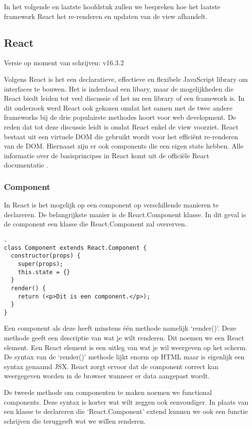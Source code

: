 In het volgende en laatste hoofdstuk zullen we bespreken hoe het laatste framework React het re-renderen en updaten van de view afhandelt.


\subsection{React}
\label{sec:JavaScript_Frameworks_React}
Versie op moment van schrijven: v16.3.2

Volgens React is het een declaratieve, effectieve en flexibele JavaScript library om interfaces te bouwen. Het is inderdaad een libary, maar de mogelijkheden die React biedt leiden tot veel discussie of het nu een library of een framework is. In dit onderzoek werd React ook gekozen omdat het samen met de twee andere frameworks bij de drie populairste methodes hoort voor web development. De reden dat tot deze discussie leidt is omdat React enkel de view voorziet. React bestaat uit een virtuele DOM die gebruikt wordt voor het efficiënt re-renderen van de DOM. Hiernaast zijn er ook components die een eigen state hebben.
Alle informatie over de basisprincipes in React komt uit de officiële React documentatie \autocite{_react_2018}.

\subsubsection{Component}
\label{sec:React_Component}
In React is het mogelijk op een component op verschillende manieren te declareren. De belangrijkste manier is de React.Component klasse. In dit geval is de component een klasse die React.Component zal overerven.

\begin{verbatim}.
class Component extends React.Component {
  constructor(props) {
    super(props);
    this.state = {}
  }  
  render() {
    return (<p>Dit is een component.</p>);
  }
}
\end{verbatim}

Een component als deze heeft minstens één methode namelijk ‘render()’. Deze methode geeft een descriptie van wat je wilt renderen. Dit noemen we een React element. Een React element is een uitleg van wat je wil weergeven op het scherm. De syntax van de ‘render()’ methode lijkt enorm op HTML maar is eigenlijk een syntax genaamd JSX. React zorgt ervoor dat de component correct kan weergegeven worden in de browser wanneer er data aangepast wordt.

De tweede methode om componenten te maken noemen we functional components. Deze syntax is korter wat wilt zeggen ook eenvoudiger. In plaats van een klasse te declareren die ‘React.Component’ extend kunnen we ook een functie schrijven die teruggeeft wat we willen renderen.

